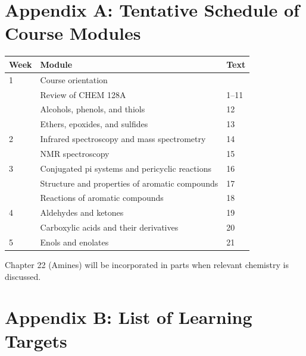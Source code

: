 \newpage

\hypertarget{appendix-a-tentative-schedule-of-course-modules}{%
\section{Appendix A: Tentative Schedule of Course
Modules}\label{appendix-a-tentative-schedule-of-course-modules}}

\begin{longtable}[]{@{}lll@{}}
\toprule
Week & Module & Text \\
\midrule
\endhead
1 & Course orientation & \\
& Review of CHEM 128A & 1--11 \\
& Alcohols, phenols, and thiols & 12 \\
& Ethers, epoxides, and sulfides & 13 \\
2 & Infrared spectroscopy and mass spectrometry & 14 \\
& NMR spectroscopy & 15 \\
3 & Conjugated pi systems and pericyclic reactions & 16 \\
& Structure and properties of aromatic compounds & 17 \\
& Reactions of aromatic compounds & 18 \\
4 & Aldehydes and ketones & 19 \\
& Carboxylic acids and their derivatives & 20 \\
5 & Enols and enolates & 21 \\
\bottomrule
\end{longtable}

Chapter 22 (Amines) will be incorporated in parts when relevant
chemistry is discussed.

\newpage

\hypertarget{appendix-a}{%
\section{Appendix B: List of Learning Targets}\label{appendix-a}}

